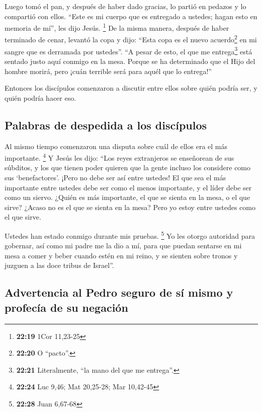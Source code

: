  Luego tomó el pan, y después de haber dado gracias, lo
partió en pedazos y lo compartió con ellos. ``Este es mi cuerpo que es
entregado a ustedes; hagan esto en memoria de mí'', les dijo Jesús.
\footnote{\textbf{22:19} 1Cor 11,23-25}  De la misma
manera, después de haber terminado de cenar, levantó la copa y dijo:
``Esta copa es el nuevo acuerdo\footnote{\textbf{22:20} O ``pacto''.} en
mi sangre que es derramada por ustedes''.  ``A pesar de
esto, el que me entrega\footnote{\textbf{22:21} Literalmente, ``la mano
  del que me entrega''.} está sentado justo aquí conmigo en la mesa.
 Porque se ha determinado que el Hijo del hombre morirá,
pero ¡cuán terrible será para aquél que lo entrega!''

 Entonces los discípulos comenzaron a discutir entre
ellos sobre quién podría ser, y quién podría hacer eso.

\hypertarget{palabras-de-despedida-a-los-discuxedpulos}{%
\subsection{Palabras de despedida a los
discípulos}\label{palabras-de-despedida-a-los-discuxedpulos}}

 Al mismo tiempo comenzaron una disputa sobre cuál de
ellos era el más importante. \footnote{\textbf{22:24} Luc 9,46; Mat
  20,25-28; Mar 10,42-45}  Y Jesús les dijo: ``Los reyes
extranjeros se enseñorean de sus súbditos, y los que tienen poder
quieren que la gente incluso los considere como sus `benefactores'.
 ¡Pero no debe ser así entre ustedes! El que sea el más
importante entre ustedes debe ser como el menos importante, y el líder
debe ser como un siervo.  ¿Quién es más importante, el
que se sienta en la mesa, o el que sirve? ¿Acaso no es el que se sienta
en la mesa? Pero yo estoy entre ustedes como el que sirve.

 Ustedes han estado conmigo durante mis pruebas.
\footnote{\textbf{22:28} Juan 6,67-68}  Yo les otorgo
autoridad para gobernar, así como mi padre me la dio a mí,
 para que puedan sentarse en mi mesa a comer y beber
cuando estén en mi reino, y se sienten sobre tronos y juzguen a las doce
tribus de Israel''.

\hypertarget{advertencia-al-pedro-seguro-de-suxed-mismo-y-profecuxeda-de-su-negaciuxf3n}{%
\subsection{Advertencia al Pedro seguro de sí mismo y profecía de su
negación}\label{advertencia-al-pedro-seguro-de-suxed-mismo-y-profecuxeda-de-su-negaciuxf3n}}

